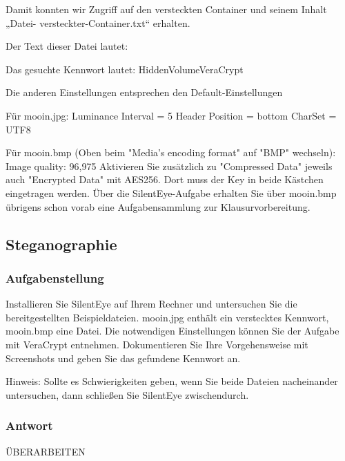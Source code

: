 \documentclass{article}
\begin{document}
Damit konnten wir Zugriff auf den versteckten Container und seinem Inhalt „Datei-
versteckter-Container.txt“ erhalten.

Der Text dieser Datei lautet:

Das gesuchte Kennwort lautet: HiddenVolumeVeraCrypt



Die anderen Einstellungen entsprechen den Default-Einstellungen

Für mooin.jpg: 
Luminance Interval = 5 
Header Position = bottom
CharSet = UTF8

Für mooin.bmp (Oben beim "Media's encoding format" auf "BMP" wechseln):
Image quality: 96,975%
Aktivieren Sie zusätzlich zu "Compressed Data" jeweils auch "Encrypted Data" mit AES256. Dort muss der Key in beide Kästchen eingetragen werden.
Über die SilentEye-Aufgabe erhalten Sie über mooin.bmp übrigens schon vorab eine Aufgabensammlung zur Klausurvorbereitung.


\newpage

\subsection{Steganographie}

\subsubsection*{Aufgabenstellung}

Installieren Sie SilentEye  auf Ihrem Rechner und untersuchen Sie die 
bereitgestellten Beispieldateien. mooin.jpg enthält ein verstecktes Kennwort, 
mooin.bmp eine Datei. Die notwendigen Einstellungen können Sie der Aufgabe mit 
VeraCrypt entnehmen. Dokumentieren Sie Ihre Vorgehensweise mit Screenshots und 
geben Sie das gefundene Kennwort an.

Hinweis: Sollte es Schwierigkeiten geben, wenn Sie beide Dateien nacheinander 
untersuchen, dann schließen Sie SilentEye zwischendurch.

\subsubsection*{Antwort}

ÜBERARBEITEN
\end{document}
